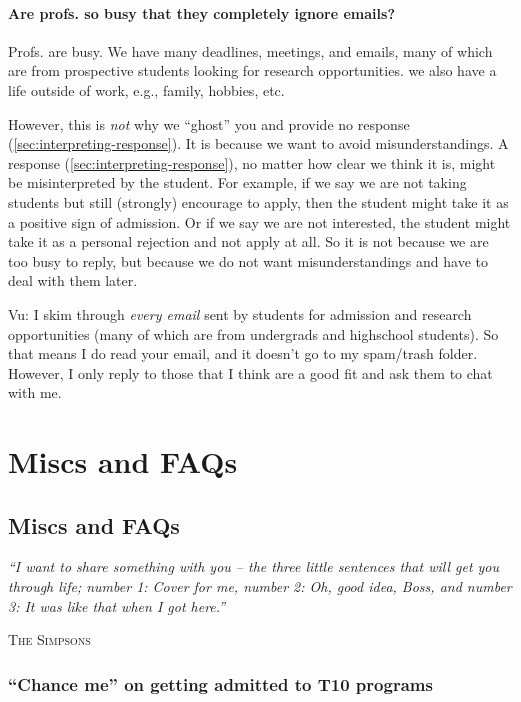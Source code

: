 \documentclass[oneside,11pt,dvipsnames]{book}
\newcommand{\myepigraphsimpsons}[1]{
\epigraph{\vspace{-0.2in} \emph{#1}}{\textsc{The Simpsons}}
}
\newenvironment{commentbox}[1][]{
  \small
  \begin{mybox}
    {\small \textbf{#1}}
  }{
  \end{mybox}
}
\begin{document}
\subsection{Are profs. so busy that they completely ignore emails?}\label{sec:busy}

Profs. are busy. We have many deadlines, meetings, and emails, many of which are from prospective students looking for research opportunities. we also have a life outside of work, e.g., family, hobbies, etc. 

However, this is \emph{not} why we ``ghost'' you and provide no response (\autoref{sec:interpreting-response}).  It is because we want to avoid misunderstandings.  A response (\autoref{sec:interpreting-response}), no matter how clear we think it is, might be misinterpreted by the student.  For example, if we say we are not taking students but still (strongly) encourage to apply, then the student might take it as a positive sign of admission. Or if we say we are not interested, the student might take it as a personal rejection and not apply at all.  So it is not because we are too busy to reply, but because we do not want misunderstandings and have to deal with them later. 




\begin{commentbox}{Vu: }
    I skim through \emph{every email} sent by students for admission and research opportunities (many of which are from undergrads and highschool students). So that means I do read your email, and it doesn't go to my spam/trash folder. 
    However, I only reply to those that I think are a good fit and ask them to chat with me.
    \end{commentbox}
    

\part{Miscs and FAQs}\label{part:faqs}
\chapter{Miscs and FAQs}\label{chap:faqs}

\myepigraphsimpsons{``I want to share something with you – the three little sentences that will get you through life; number 1: Cover for me, number 2: Oh, good idea, Boss, and number 3: It was like that when I got here.''}

\section{``Chance me'' on getting admitted to T10 programs}\label{sec:chance-me}
\end{document}
